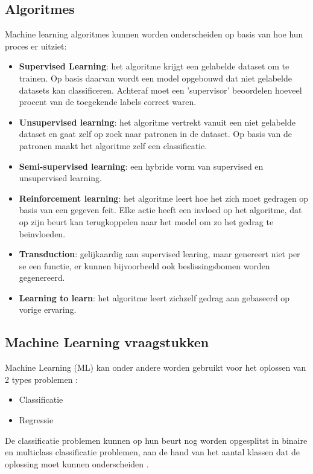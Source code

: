 \subsection{Algoritmes}
Machine learning algoritmes kunnen worden onderscheiden op basis van hoe hun proces er uitziet:
\begin{itemize}
    \item \textbf{Supervised Learning}: het algoritme krijgt een gelabelde dataset om te trainen. Op basis daarvan wordt een model opgebouwd dat niet gelabelde datasets kan classificeren. Achteraf moet een 'supervisor' beoordelen hoeveel procent van de toegekende labels correct waren. 
    \item \textbf{Unsupervised learning}: het algoritme vertrekt vanuit een niet gelabelde dataset en gaat zelf op zoek naar patronen in de dataset. Op basis van de patronen maakt het algoritme zelf een classificatie.
    \item \textbf{Semi-supervised learning}: een hybride vorm van supervised en unsupervised learning.
    \item \textbf{Reinforcement learning}: het algoritme leert hoe het zich moet gedragen op basis van een gegeven feit. Elke actie heeft een invloed op het algoritme, dat op zijn beurt kan terugkoppelen naar het model om zo het gedrag te beïnvloeden.
    \item \textbf{Transduction}: gelijkaardig aan supervised learing, maar genereert niet per se een functie, er kunnen bijvoorbeeld ook beslissingsbomen worden gegenereerd.
    \item \textbf{Learning to learn}: het algoritme leert zichzelf gedrag aan gebaseerd op vorige ervaring.
\end{itemize}
\autocite{Zhang2010}

\subsection{Machine Learning vraagstukken}
Machine Learning (ML) kan onder andere worden gebruikt voor het oplossen van 2 types problemen : 
\begin{itemize}
    \item Classificatie
    \item Regressie
\end{itemize}  

De classificatie problemen kunnen op hun beurt nog worden opgesplitst in binaire en multiclass classificatie problemen, aan de hand van het aantal klassen dat de oplossing moet kunnen onderscheiden \autocite{Olugbenga2022}.

